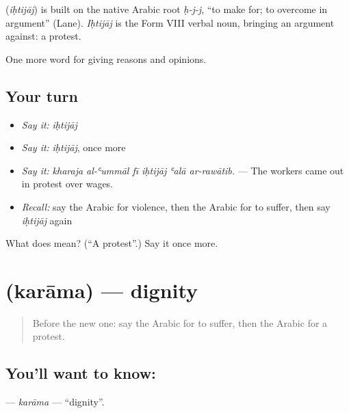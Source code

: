 \begin{cousinweb}
\textbf{} (\emph{iḥtijāj}) is built on the native Arabic root \emph{ḥ-j-j}, \textquotedblleft{}to make for; to overcome in argument\textquotedblright{} (Lane). \emph{Iḥtijāj} is the Form VIII verbal noun, bringing an argument against: a protest.
\end{cousinweb}

\begin{grammarlens}[title={What you've built}]
One more word for giving reasons and opinions.
\end{grammarlens}

\subsection*{Your turn}
\begin{itemize}
\raggedright
  \item \emph{Say it:} \emph{iḥtijāj}
  \item \emph{Say it:} \emph{iḥtijāj}, once more
  \item \emph{Say it:} \emph{kharaja al-ʿummāl fī iḥtijāj ʿalā ar-rawātib.} — The workers came out in protest over wages.
  \item \emph{Recall:} say the Arabic for violence, then the Arabic for to suffer, then say \emph{iḥtijāj} again
\end{itemize}

\begin{tcolorbox}[breakable,colback=teal!4,colframe=teal!35!black,title={Before you move on}]
What does  mean? (\textquotedblleft{}A protest\textquotedblright{}.) Say it once more.
\end{tcolorbox}
\section[\texorpdfstring{\ar{كرامة} (karāma)}{كرامة (karāma)}]{ (karāma) — dignity}

\label{lesson:AR-C382-karama}



\begin{quote}
Before the new one: say the Arabic for to suffer, then the Arabic for a protest.
\end{quote}

\subsection*{You'll want to know: }
\textbf{} — \emph{karāma} — \textquotedblleft{}dignity\textquotedblright{}.


